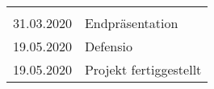 \begin{longtable}[]{@{}ll@{}}
\begin{minipage}[t]{0.61\columnwidth}
\end{minipage}\tabularnewline
\begin{minipage}[t]{0.33\columnwidth}\raggedright
31.03.2020\strut
\end{minipage} & \begin{minipage}[t]{0.61\columnwidth}\raggedright
Endpräsentation\strut
\end{minipage}\tabularnewline
\begin{minipage}[t]{0.33\columnwidth}\raggedright
19.05.2020\strut
\end{minipage} & \begin{minipage}[t]{0.61\columnwidth}\raggedright
Defensio\strut
\end{minipage}\tabularnewline
\begin{minipage}[t]{0.33\columnwidth}\raggedright
19.05.2020\strut
\end{minipage} & \begin{minipage}[t]{0.61\columnwidth}\raggedright
Projekt fertiggestellt\strut
\end{minipage}\tabularnewline
\bottomrule
\end{longtable}
